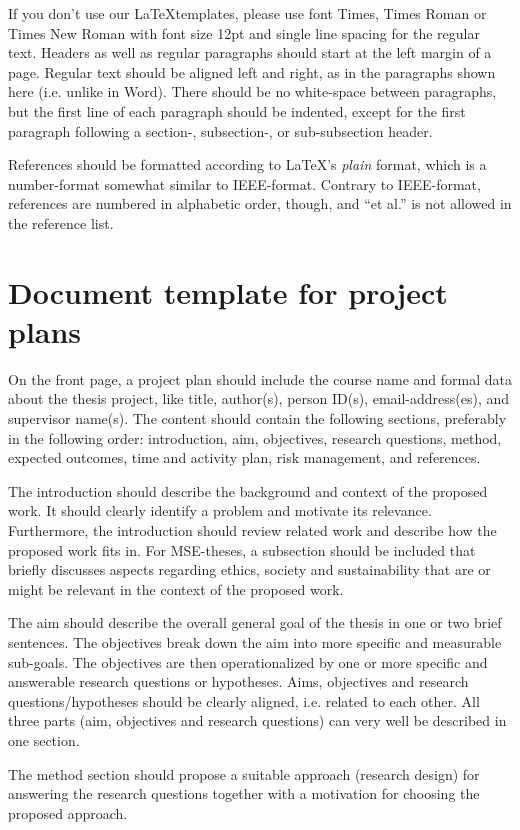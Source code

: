 \documentclass[a4paper,12pt]{book}
\begin{document}
If you don't use our \LaTeX\-templates, please use font Times, Times Roman or
Times New Roman with font size 12pt and single line spacing for the regular text. 
Headers as well as regular paragraphs should start at the left margin of a page.
Regular text should be aligned left and right, as in the paragraphs shown here (i.e. unlike in Word).
There should be no white-space between paragraphs, but the first line of each
paragraph should be indented, except for the first paragraph following a section-, subsection-, or sub-subsection header.

References should be formatted according to \LaTeX's \textit{plain} format,
which is a number-format somewhat similar to IEEE-format. Contrary to IEEE-format,
references are numbered in alphabetic order, though, and ``et al.'' is not allowed
in the reference list.


\section{Document template for project plans}
On the front page, a project plan should include the course name and formal data
about the thesis project, like title, author(s), person ID(s), email-address(es),
and supervisor name(s). The content should contain the following sections,
preferably in the following order:
introduction, aim, objectives, research questions, method, expected outcomes,
time and activity plan, risk management, and references.

The introduction should describe the background and context of the proposed work.
It should clearly identify a problem and motivate its relevance. Furthermore,
the introduction should review related work and describe how the proposed work
fits in. For MSE-theses, a subsection should be included that briefly discusses
aspects regarding ethics, society and sustainability that are or might be relevant
in the context of the proposed work. 

The aim should describe the overall general goal of the thesis in one or two
brief sentences. The objectives break down the aim into more specific
and measurable sub-goals. The objectives are then operationalized by
one or more specific and answerable research questions or hypotheses.
Aims, objectives and research questions/hypotheses should be clearly aligned,
i.e. related to each other. All three parts (aim, objectives and research questions)
can very well be described in one section.

The method section should propose a suitable approach (research design) for
answering the research questions together with a motivation for choosing
the proposed approach.
\end{document}
